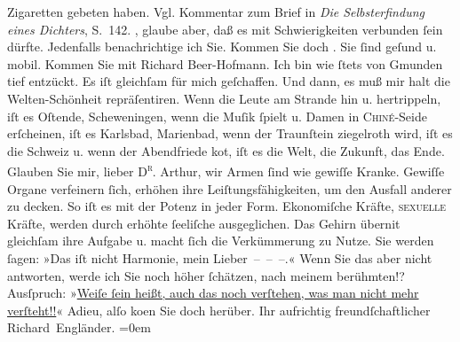 \begin{ledgroupsized}[t]{13cm}
{{{                  Zigaretten gebeten haben. Vgl. Kommentar zum Brief in \emph{Die
                        Selbsterfindung eines Dichters}, S. 142.
               }}}\label{K_L00468-1h}, glaube aber, daß es mit Schwierigkeiten verbunden ſein dürfte. Jedenfalls
               benachrichtige ich Sie. Kommen Sie doch \label{K_L00468-2v}\label{K_L00468-2h}. Sie ſind geſund u. mobil. Kommen Sie mit Richard Beer-Hofmann. Ich bin wie ſtets von Gmunden tief entzückt. Es iſt gleichſam für {\pb}mich geſchaffen. Und dann, es muß mir halt
               die Welten-Schönheit  repräſentiren. Wenn die Leute
               am Strande hin u. hertrippeln, iſt es Oſtende,
                  Sch\introOben{}e\introOben{}weningen, wenn
               die Muſik ſpielt u. Damen in \textsc{Chiné}-Seide erſcheinen, iſt es
               Karlsbad, Marienbad, wenn der Traunſtein ziegelroth wird, iſt es
               die Schweiz u. wenn der Abendfriede ko{\geminationm}t, iſt  es die  Welt, die Zukunft, \introOben{}das Ende.\introOben{}
               Glauben Sie mir, lieber \textsc{D\textsuperscript{r}}. Arthur, wir Armen ſind wie gewiſſe {\pb}Kranke. Gewiſſe Organe verfeinern ſich, erhöhen ihre Leiſtungsfähigkeiten, um den
               Ausfall anderer zu decken. So iſt es mit der Potenz in jeder Form. Ekonomiſche
               Kräfte, \textsc{sexuelle} Kräfte, werden durch erhöhte ſeeliſche
               ausgeglichen. Das Gehirn überni{\geminationm}t gleichſam ihre Aufgabe
               u. macht ſich die Verkümmerung zu Nutze.\pend
           \pstart
           Sie werden ſagen: »Das iſt nicht Harmonie, mein Lieber – – –.« {\pb}Wenn Sie das aber nicht antworten, werde
               ich Sie noch höher ſchätzen, nach meinem berühmten\introOben{}!?\introOben{}
               Ausſpruch: »\uline{Weiſe ſein heißt,  auch das noch verſtehen, was man nicht mehr verſteht!!}«\pend
           \pstart
           Adieu, alſo ko{\geminationm}en Sie doch herüber.\pend
           \pstart
           Ihr aufrichtig freundſchaftlicher{\\[\baselineskip]}\spacefill\mbox{Richard Engländer.}\pend
           \leftskip=0em{}
         
         \endnumbering{}\end{ledgroupsized}  \newcommand{\dateiname}{L00468}\newcommand{\titel}{Peter Altenberg an Arthur Schnitzler, [30. 7. 1895]}\newcommand{\editorInnen}{Martin Anton Müller und Gerd-Hermann Susen}
      